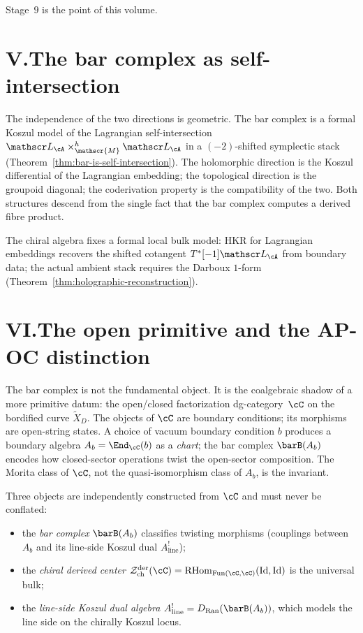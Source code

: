 \medskip
Stage~$9$ is the point of this volume.

\section*{V.\quad The bar complex as self-intersection}

The independence of the two directions is geometric. The bar
complex is a formal Koszul model of the Lagrangian
self-intersection $\cL_\cA \times_{\mathscr{M}}^h \cL_\cA$ in a
$(-2)$-shifted symplectic stack
(Theorem~\ref{thm:bar-is-self-intersection}). The holomorphic
direction is the Koszul differential of the Lagrangian
embedding; the topological direction is the groupoid diagonal;
the coderivation property is the compatibility of the two. Both
structures descend from the single fact that the bar complex
computes a derived fibre product.

The chiral algebra fixes a formal local bulk model: HKR for
Lagrangian embeddings recovers the shifted cotangent
$T^*[-1]\cL_\cA$ from boundary data; the actual ambient stack
requires the Darboux $1$-form
(Theorem~\ref{thm:holographic-reconstruction}).

\section*{VI.\quad The open primitive and the AP-OC distinction}

The bar complex is not the fundamental object. It is the
coalgebraic shadow of a more primitive datum: the open/closed
factorization dg-category~$\cC$ on the bordified curve
$\widetilde{X}_D$. The objects of $\cC$ are boundary
conditions; its morphisms are open-string states. A choice of
vacuum boundary condition $b$ produces a boundary algebra
$A_b = \End_\cC(b)$ as a \emph{chart}; the bar complex
$\barB(A_b)$ encodes how closed-sector operations twist the
open-sector composition. The Morita class of $\cC$, not the
quasi-isomorphism class of $A_b$, is the invariant.

Three objects are independently constructed from $\cC$ and must
never be conflated:
\begin{itemize}[nosep]
\item the \emph{bar complex} $\barB(A_b)$ classifies twisting
 morphisms (couplings between $A_b$ and its line-side Koszul
 dual $A^!_{\mathrm{line}}$);
\item the \emph{chiral derived center}
 $\cZ^{\mathrm{der}}_{\mathrm{ch}}(\cC)
 = \RHom_{\operatorname{Fun}(\cC,\cC)}(\operatorname{Id},
 \operatorname{Id})$ is the universal bulk;
\item the \emph{line-side Koszul dual algebra}
 $A^!_{\mathrm{line}}
 = D_{\operatorname{Ran}}(\barB(A_b))$, which models the line
 side on the chirally Koszul locus.
\end{itemize}

